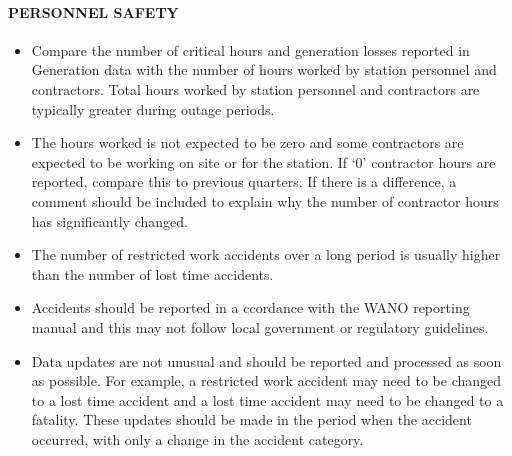 \paragraph{PERSONNEL SAFETY}
\begin{itemize}
\item Compare the number of critical hours and generation losses reported in
Generation data with the number of hours worked by station personnel
and contractors. Total hours worked by station personnel and contractors
are typically greater during outage periods.
\item The hours worked is not expected to be zero and some contractors are
expected to be working on site or for the station. If ‘0’ contractor hours are
reported, compare this to previous quarters. If there is a difference, a
comment should be included to explain why the number of contractor
hours has significantly changed.
\item The number of restricted work accidents over a long period is usually
higher than the number of lost time accidents.
\item Accidents should be reported in a ccordance with the WANO reporting
manual and this may not follow local government or regulatory guidelines.
\item Data updates are not unusual and should be reported and processed as
soon as possible. For example, a restricted work accident may need to be
changed to a lost time accident and a lost time accident may need to be
changed to a fatality. These updates should be made in the period when
the accident occurred, with only a change in the accident category.
\end{itemize}